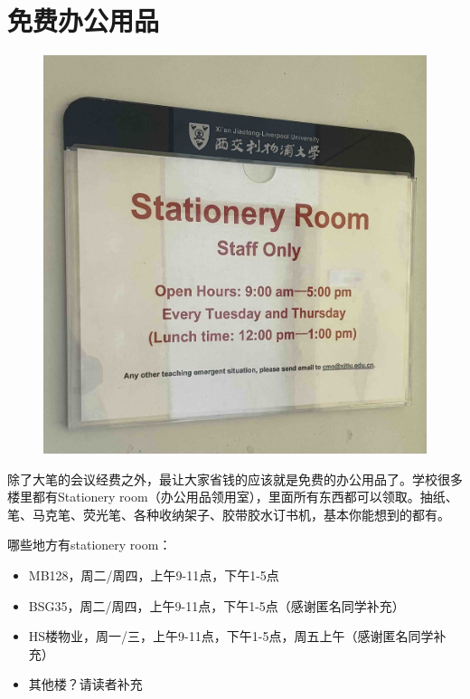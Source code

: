 \section{免费办公用品}
\begin{figure}[H]
    \centering
    \includegraphics[width=0.6\columnwidth]{author-folder/Kai.Wu/stationery_room.jpg}
\end{figure}

除了大笔的会议经费之外，最让大家省钱的应该就是免费的办公用品了。学校很多楼里都有Stationery room（办公用品领用室），里面所有东西都可以领取。抽纸、笔、马克笔、荧光笔、各种收纳架子、胶带胶水订书机，基本你能想到的都有。

\vspace{5mm}
哪些地方有stationery room：
\begin{itemize}
    \item MB128，周二/周四，上午9-11点，下午1-5点
    \item BSG35，周二/周四，上午9-11点，下午1-5点（感谢匿名同学补充）
    \item HS楼物业，周一/三，上午9-11点，下午1-5点，周五上午（感谢匿名同学补充）
    \item 其他楼？请读者补充
\end{itemize}

